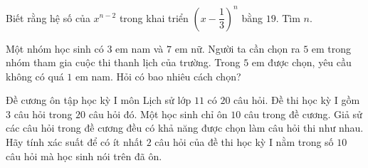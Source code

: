 \begin{bt}%
Biết rằng hệ số của $ x^{n-2} $ trong khai triển $ \left ( x - \dfrac{1}{3} \right )^n $ bằng $ 19 $. Tìm $ n $.	
\end{bt}
\begin{bt}%
Một nhóm học sinh có $ 3 $ em nam và $ 7 $ em nữ. Người ta cần chọn ra $ 5 $ em trong nhóm tham gia cuộc thi thanh lịch của trường. Trong $ 5 $ em được chọn, yêu cầu không có quá $ 1 $ em nam. Hỏi có bao nhiêu cách chọn?	
\end{bt}
\begin{bt}%
Đề cương ôn tập học kỳ I môn Lịch sử lớp $ 11 $ có $ 20 $ câu hỏi. Đề thi học kỳ I gồm $ 3 $ câu hỏi trong $ 20 $ câu hỏi đó. Một học sinh chỉ ôn $ 10 $ câu trong đề cương. Giả sử các câu hỏi trong đề cương đều có khả năng được chọn làm câu hỏi thi như nhau. Hãy tính xác suất để có ít nhất $ 2 $ câu hỏi của đề thi học kỳ I nằm trong số $ 10 $ câu hỏi mà học sinh nói trên đã ôn.	
\end{bt}
